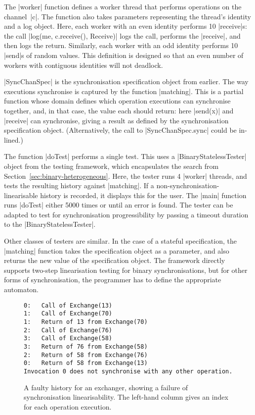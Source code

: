 
The |worker| function defines a worker thread that performs operations on the
channel~|c|.  The function also takes parameters representing the thread's
identity and a log object.  Here, each worker with an even identity performs
10 |receive|s: the call |log(me, c.receive(), Receive)| logs the
call, performs the |receive|, and then logs the return.  Similarly, each
worker with an odd identity performs 10 |send|s of random values.
This definition is designed so that an even number of workers with contiguous
identities will not deadlock. 

|SyncChanSpec| is the synchronisation specification object from earlier.  The
way executions synchronise is captured by the function |matching|.  This is a
partial function whose domain defines which operation executions can
synchronise together, and, in that case, the value each should return: here
|send(x)| and |receive| can synchronise, giving a result as defined by the
synchronisation specification object.  (Alternatively, the call to
|SyncChanSpec.sync| could be in-lined.)

The function |doTest| performs a single test.  This uses a
|BinaryStatelessTester| object from the testing framework, which encapsulates
the search from Section~\ref{sec:binary-heterogeneous}.  Here, the tester runs
4 |worker| threads, and tests the resulting history against |matching|.  If a
non-synchronisation-linearisable history is recorded, it displays this for the
user.  The |main| function runs |doTest| either 5000 times or until an error
is found.  The tester can be adapted to test for synchronisation
progressibility by passing a timeout duration to the |BinaryStatelessTester|.

Other classes of testers are similar.  In the case of a stateful
specification, the |matching| function takes the specification object as a
parameter, and also returns the new value of the specification object.  The
framework directly supports two-step linearisation testing for binary
synchronisations, but for other forms of synchronisation, the programmer has
to define the appropriate automaton.


\begin{figure}
\begin{verbatim}
0:   Call of Exchange(13)
1:   Call of Exchange(70)
1:   Return of 13 from Exchange(70)
2:   Call of Exchange(76)
3:   Call of Exchange(58)
3:   Return of 76 from Exchange(58)
2:   Return of 58 from Exchange(76)
0:   Return of 58 from Exchange(13)
Invocation 0 does not synchronise with any other operation.
\end{verbatim}
\caption{A faulty history for an exchanger, showing a failure of
  synchronisation linearisability.  The left-hand column gives an index for
  each operation execution.}
\label{fig:exchanger-error}
\end{figure}

